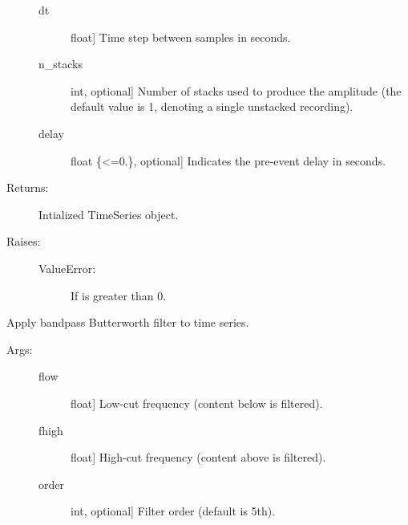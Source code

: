 \documentclass[letterpaper,10pt,english]{sphinxmanual}
\begin{document}
\begin{fulllineitems}
\begin{fulllineitems}
\begin{description}
\begin{description}
\item[{dt}] \leavevmode{[}float{]}
Time step between samples in seconds.

\item[{n\_stacks}] \leavevmode{[}int, optional{]}
Number of stacks used to produce the amplitude (the
default value is 1, denoting a single unstacked 
recording).

\item[{delay}] \leavevmode{[}float \{\textless{}=0.\}, optional{]}
Indicates the pre-event delay in seconds.

\end{description}

\item[{Returns:}] \leavevmode
Intialized TimeSeries object.

\item[{Raises:}] \leavevmode\begin{description}
\item[{ValueError:}] \leavevmode
If  is greater than 0.

\end{description}

\end{description}

\end{fulllineitems}


\begin{fulllineitems}
\label{\detokenize{index:sigpropy.TimeSeries.bandpassfilter}}
Apply bandpass Butterworth filter to time series.
\begin{description}
\item[{Args:}] \leavevmode\begin{description}
\item[{flow}] \leavevmode{[}float{]}
Low-cut frequency (content below  is filtered).

\item[{fhigh}] \leavevmode{[}float{]}
High-cut frequency (content above  is filtered).

\item[{order}] \leavevmode{[}int, optional{]}
Filter order (default is 5th).

\end{description}


\end{description}
\end{fulllineitems}
\end{fulllineitems}
\end{document}
